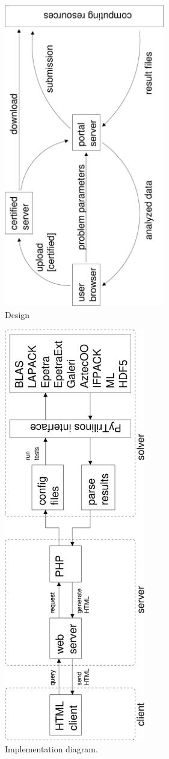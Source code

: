 \documentclass[11pt,relax]{SANDreport}
\begin{document}
\smallskip

\begin{figure}
\includegraphics[width=7cm,angle=-90]{portal_design}
\caption{Design}
\label{fig:design}
\end{figure}

\begin{figure}
\includegraphics[height=18cm,angle=-90]{diagram}
\caption{Implementation diagram.}
\label{fig:design}
\end{figure}
\end{document}
